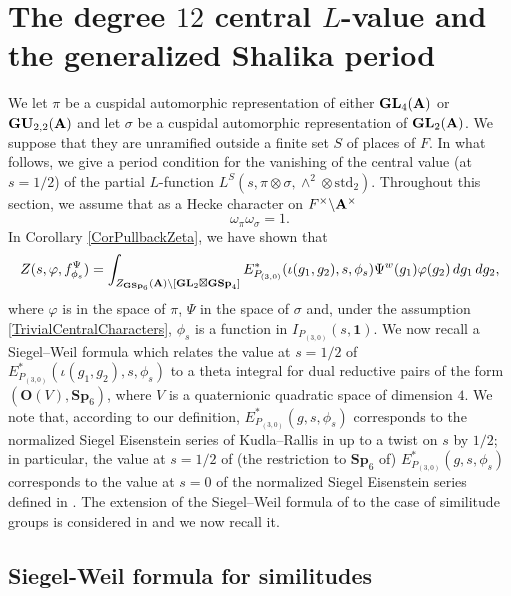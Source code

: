 \documentclass[11pt, reqno]{amsart}
\theoremstyle{plain}
\theoremstyle{definition}
\theoremstyle{remark}
\theoremstyle{plain}
\def\A{{\bf A}}
\def\GSp{{\mathbf{GSp}}}
\def\Sp{{\mathbf{Sp}}}
\def\GU{{\mathbf{GU}}}
\def\GL{\mathbf{GL}}
\begin{document}
\section{The degree $12$ central $L$-value and the generalized Shalika period}\label{Section:Period:Central:Value}
We let $\pi$ be a cuspidal automorphic representation of either $\GL_4(\A)$ or $\GU_{2,2}(\A)$ and let $\sigma$ be a cuspidal automorphic representation of $\GL_2(\A)$. We suppose that they are unramified outside a finite set $S$ of places of $F$. In what follows, we give a period condition for the vanishing of the central value (at $s=1/2$) of the partial $L$-function $L^S(s,\pi \otimes \sigma, \wedge^2 \otimes  \mathrm{std}_2)$. Throughout this section, we assume that as a Hecke character on $F^\times \backslash \A^\times$ \begin{equation}\label{TrivialCentralCharacters}
    \omega_\pi \omega_\sigma = 1.
\end{equation}
In Corollary \ref{CorPullbackZeta}, we have shown that 
\[Z(s,\varphi, f^\Psi_{\phi_s}) = \int_{Z_{\GSp_6}(\A)\backslash [\GL_2\boxtimes \GSp_4]} E_{P_{(3,0)}}^*(\iota( g_1  , g_2), s,\phi_s) \Psi^w( g_1  ) \varphi(g_2)\, dg_1\,dg_2,\]
where $\varphi$ is in the space of $\pi$, $\Psi$ in the space of $\sigma$ and, under the assumption \eqref{TrivialCentralCharacters}, $\phi_s$ is a function in $I_{P_{(3,0)}}(s, \mathbf{1})$. We now recall a Siegel--Weil formula which relates the value at $s=1/2$ of $E_{P_{(3,0)}}^*(\iota( g_1  , g_2), s,\phi_s)$
to a theta integral for dual reductive pairs of the form $(\mathbf{O}(V),\Sp_6)$, where $V$ is a quaternionic quadratic space of dimension $4$. We note that, according to our definition, $E_{P_{(3,0)}}^*(g, s,\phi_s)$ corresponds to the normalized Siegel Eisenstein series of Kudla--Rallis in \cite{KudlaRallis} up to a twist on $s$ by $1/2$; in particular, the value at $s=1/2$ of (the restriction to $\Sp_6$ of) $E_{P_{(3,0)}}^*(g, s,\phi_s)$ corresponds to the value at $s=0$ of the normalized Siegel Eisenstein series defined in \cite[p. 4]{KudlaRallis}. The extension of the Siegel--Weil formula of \cite{KudlaRallis} to the case of similitude groups is considered in  \cite[Theorem 4.1]{KudlaHarrisJacquet} and we now recall it.

\subsection{Siegel-Weil formula for similitudes}\label{subsec:SW:Similitudes}
\end{document}
